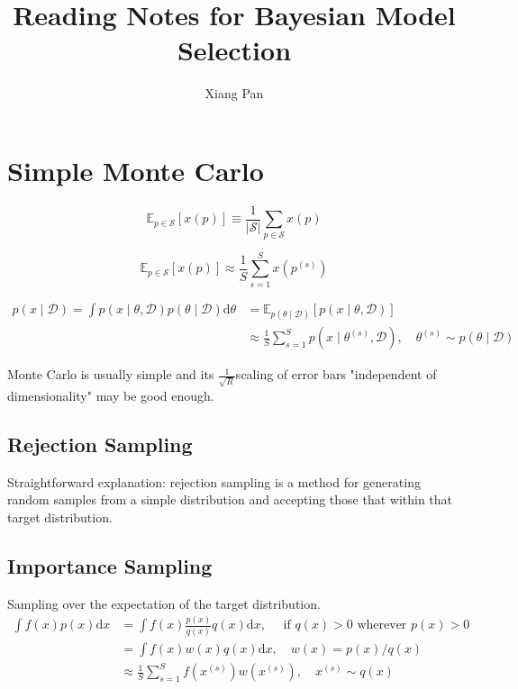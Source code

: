 \documentclass{article}
\title{Reading Notes for Bayesian Model Selection}
\author{Xiang Pan}
\begin{document}
\section{Simple Monte Carlo}
\begin{equation}
    \mathbb{E}_{p \in \mathcal{S}}[x(p)] \equiv \frac{1}{|\mathcal{S}|} \sum_{p \in \mathcal{S}} x(p)
\end{equation}

\begin{equation}
    \mathbb{E}_{p \in \mathcal{S}}[x(p)] \approx \frac{1}{S} \sum_{s=1}^{S} x\left(p^{(s)}\right)
\end{equation}

\begin{equation}
    \begin{aligned}
    p(x \mid \mathcal{D})=\int p(x \mid \theta, \mathcal{D}) p(\theta \mid \mathcal{D}) \mathrm{d} \theta &=\mathbb{E}_{p(\theta \mid \mathcal{D})}[p(x \mid \theta, \mathcal{D})] \\
    & \approx \frac{1}{S} \sum_{s=1}^{S} p\left(x \mid \theta^{(s)}, \mathcal{D}\right), \quad \theta^{(s)} \sim p(\theta \mid \mathcal{D})
    \end{aligned}
\end{equation}

Monte Carlo is usually simple and its $\frac{1}{\sqrt{R}}$scaling of error bars "independent of dimensionality" may be good enough.


\subsection{Rejection Sampling}
Straightforward explanation: rejection sampling is a method for generating random samples from a simple distribution and accepting those that within that target distribution.

\subsection{Importance Sampling}

Sampling over the expectation of the target distribution.
\begin{equation}
    \begin{aligned}
    \int f(x) p(x) \mathrm{d} x &=\int f(x) \frac{p(x)}{q(x)} q(x) \mathrm{d} x, \quad \text { if } q(x)>0 \text { wherever } p(x)>0 \\
    &=\int f(x) w(x) q(x) \mathrm{d} x, \quad w(x)=p(x) / q(x) \\
    & \approx \frac{1}{S} \sum_{s=1}^{S} f\left(x^{(s)}\right) w\left(x^{(s)}\right), \quad x^{(s)} \sim q(x)
    \end{aligned}
\end{equation}
\end{document}
